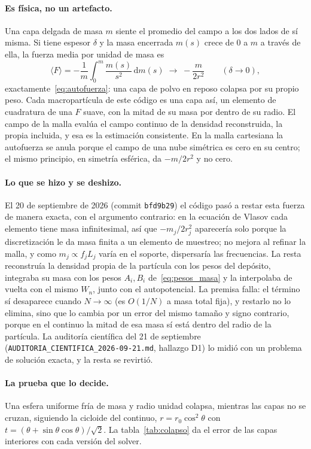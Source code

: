 \documentclass[11pt,a4paper]{article}
\newcommand{\dd}{\mathrm{d}}
\begin{document}
\paragraph{Es física, no un artefacto.} Una capa delgada de masa $m$ siente el promedio
del campo a los dos lados de sí misma. Si tiene espesor $\delta$ y la masa encerrada
$m(s)$ crece de $0$ a $m$ a través de ella, la fuerza media por unidad de masa es
\begin{equation}
  \langle F\rangle=-\frac{1}{m}\int_0^{m}\frac{m(s)}{s^{2}}\,\dd m(s)
  \;\longrightarrow\;-\frac{m}{2r^{2}}\qquad(\delta\to0),
\end{equation}
exactamente~\eqref{eq:autofuerza}: una capa de polvo en reposo colapsa por su propio peso.
Cada macropartícula de este código es una capa así, un elemento de cuadratura de una $F$
suave, con la mitad de su masa por dentro de su radio. El campo de la malla evalúa el campo
continuo de la densidad reconstruida, la propia incluida, y esa es la estimación
consistente. En la malla cartesiana la autofuerza se anula porque el campo de una nube
simétrica es cero en su centro; el mismo principio, en simetría esférica, da $-m/2r^{2}$
y no cero.

\paragraph{Lo que se hizo y se deshizo.} El 20 de septiembre de 2026 (commit
\texttt{bfd9b29}) el código pasó a restar esta fuerza de manera exacta, con el argumento
contrario: en la ecuación de Vlasov cada elemento tiene masa infinitesimal, así que
$-m_j/2r_j^{2}$ aparecería solo porque la discretización le da masa finita a un elemento
de muestreo; no mejora al refinar la malla, y como $m_j\propto f_jL_j$ varía en el
soporte, dispersaría las frecuencias. La resta reconstruía la densidad propia de la
partícula con los pesos del depósito, integraba su masa con los pesos $A_i,B_i$
de~\eqref{eq:pesos_masa} y la interpolaba de vuelta con el mismo $W_n$, junto con el
autopotencial. La premisa falla: el término sí desaparece cuando $N\to\infty$ (es $O(1/N)$
a masa total fija), y restarlo no lo elimina, sino que lo cambia por un error del mismo
tamaño y signo contrario, porque en el continuo la mitad de esa masa sí está dentro del
radio de la partícula. La auditoría científica del 21 de septiembre
(\texttt{AUDITORIA\_CIENTIFICA\_2026-09-21.md}, hallazgo D1) lo midió con un problema de
solución exacta, y la resta se revirtió.

\paragraph{La prueba que lo decide.} Una esfera uniforme fría de masa y radio unidad
colapsa, mientras las capas no se cruzan, siguiendo la cicloide del continuo,
$r=r_0\cos^{2}\theta$ con $t=(\theta+\sin\theta\cos\theta)/\sqrt2$. La
tabla~\ref{tab:colapso} da el error de las capas interiores con cada versión del solver.
\end{document}
